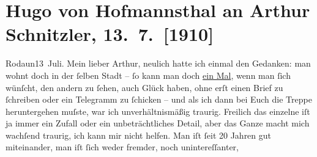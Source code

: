 

         
         \newcommand{\erwaehntePersonen}{Personen: Richard Beer-Hofmann, Rose Friedmann, Louis Philipp Friedmann, Olga Schnitzler, Heinrich Schnitzler, Lilly Schnitzler}
         \newcommand{\erwaehnteOrte}{Orte: Arlberg, Bad Aussee, Bodensee, Canazei, Grand Hotel Excelsior, Hofmannsthal-Schlössl, Lido, München, Rodaun, Tirol, Welsberg-Taisten, Wien}
         \newcommand{\erwaehnteWerke}{Werke: Cristinas Heimreise. Komödie, Der Rosenkavalier}
               \section[Hugo von Hofmannsthal an Arthur Schnitzler, 13. 7. {[}1910{]}]{ Hugo von Hofmannsthal an Arthur Schnitzler, 13. 7. {[}1910{]}}\nopagebreak{}\rehead{ }\begin{ledgroupsized}[t]{13cm}\normalsize\beginnumbering \toendnotes[C]{\smallbreak\pagebreak[2]} 
\toendnotes[C]{\smallbreak}\pstart
           \raggedleft{}{\pb}Rodaun13 Juli.\pend
           \pstart{}Mein lieber Arthur, \pend\pstart
           neulich hatte ich einmal den Gedanken: man wohnt doch in der ſelben Stadt – ſo kann
               man doch \uline{ein Mal}, wenn man ſich wünſcht, den andern
               zu ſehen, auch Glück haben, ohne erſt einen Brief zu ſchreiben oder ein Telegramm zu
               ſchicken – und als ich dann bei Euch die Treppe heruntergehen {\pb}muſste, war ich unverhältnismäßig
               traurig. Freilich das einzelne iſt ja immer ein Zufall oder ein unbeträchtliches
               Detail, aber das Ganze macht mich wachſend traurig, ich kann mir nicht helfen. Man
               iſt ſeit 20 Jahren gut miteinander, man iſt ſich weder fremder, noch unintereſſanter,

\end{ledgroupsized}
